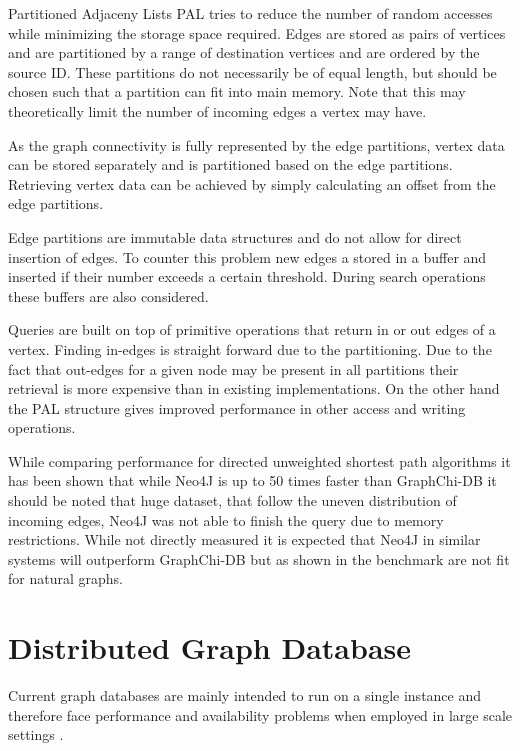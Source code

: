 \documentclass{sig-alternate}
\begin{document}
Partitioned Adjaceny Lists PAL \cite{kyrola2014graphchi} tries to reduce the number of random accesses while minimizing the storage
space required. Edges are stored as pairs of vertices and are partitioned by a range of destination
vertices and are ordered by the source ID. These partitions do not necessarily be of equal length, but should 
be chosen such that a partition can fit into main memory. Note that this may theoretically limit the number of
incoming edges a vertex may have.

As the graph connectivity is fully represented 
by the edge partitions, vertex data can be stored separately and is partitioned 
based on the edge partitions. Retrieving vertex data can be achieved by simply calculating an offset from
the edge partitions.

Edge partitions are immutable data structures and do not allow for direct insertion of edges. 
To counter this problem new edges a stored in a buffer and inserted if their number exceeds a certain threshold.
During search operations these buffers are also considered.

Queries are built on top of primitive operations that return in or out edges of a vertex.
Finding in-edges is straight forward due to the partitioning. Due to the fact that out-edges
for a given node may be present in all partitions their retrieval is more expensive than
in existing implementations. On the other hand the PAL structure gives improved performance in other access and writing operations.

While comparing performance for directed unweighted shortest path algorithms it has been shown that while Neo4J
is up to 50 times faster than GraphChi-DB it should be noted that huge dataset, that follow the uneven distribution 
of incoming edges, Neo4J was not able to finish the query due to memory restrictions.
While not directly measured it is expected that Neo4J in similar systems will outperform 
GraphChi-DB but as shown in the benchmark are not fit for natural graphs.

\section{Distributed Graph Database}
Current graph databases are mainly intended to run on a single instance and therefore
face performance and availability problems when employed in large scale settings \cite{dayarathna2012xgdbench} 
\cite{dayarathna2013graph}.
\end{document}
